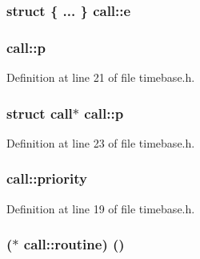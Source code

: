 \subsubsection[{\texorpdfstring{e}{e}}]{\setlength{\rightskip}{0pt plus 5cm}struct \{ ... \}   call\+::e}\hypertarget{structcall_a50f800b41e602b0ba7ff1052e4ad6a92}{}\label{structcall_a50f800b41e602b0ba7ff1052e4ad6a92}
\subsubsection[{\texorpdfstring{p}{p}}]{ call\+::p}\hypertarget{structcall_a28e8fe3a54f9fb88e4a27f20458f1cbe}{}\label{structcall_a28e8fe3a54f9fb88e4a27f20458f1cbe}


Definition at line 21 of file timebase.\+h.

\subsubsection[{\texorpdfstring{p}{p}}]{\setlength{\rightskip}{0pt plus 5cm}struct {\bf call}$\ast$ call\+::p}\hypertarget{structcall_aee32cf5949691e418649c7b5758ac920}{}\label{structcall_aee32cf5949691e418649c7b5758ac920}


Definition at line 23 of file timebase.\+h.

\subsubsection[{\texorpdfstring{priority}{priority}}]{ call\+::priority}\hypertarget{structcall_a3193459339ea2cd7def783bf558ec218}{}\label{structcall_a3193459339ea2cd7def783bf558ec218}


Definition at line 19 of file timebase.\+h.

\subsubsection[{\texorpdfstring{routine}{routine}}]{($\ast$ call\+::routine) ()}\hypertarget{structcall_a73409c26b38fb482fae6d3e4c6eee83f}{}\label{structcall_a73409c26b38fb482fae6d3e4c6eee83f}


